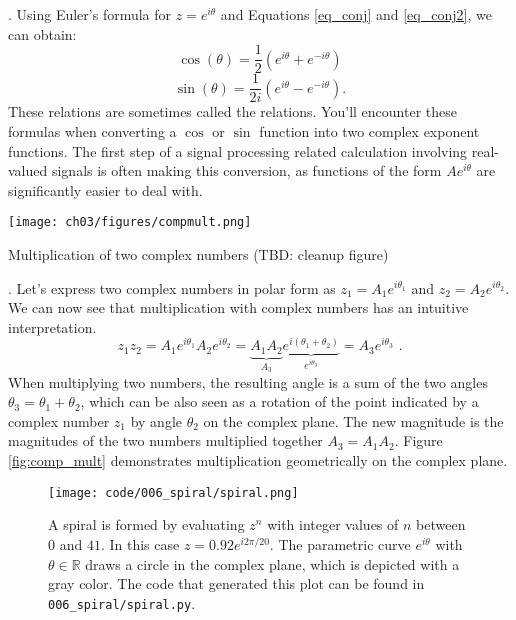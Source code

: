 . Using Euler's formula for $z=e^{i\theta}$ and Equations \ref{eq_conj} and \ref{eq_conj2}, we can obtain:
\begin{equation}
\boxed{
  \cos(\theta)  = \frac{1}{2}\left(e^{i\theta} + e^{-i\theta}\right) \label{inveul0}
  }
  \end{equation}
\begin{equation}
\boxed{
  \sin(\theta)  = \frac{1}{2i}\left(e^{i\theta} - e^{-i\theta}\right). \label{inveul}
  }
\end{equation}
These relations are sometimes called the \emph{} relations. You'll encounter these formulas when converting a $\cos$ or $\sin$ function into two complex exponent functions. The first step of a signal processing related calculation involving real-valued signals is often making this conversion, as functions of the form $A e^{i\theta}$ are significantly easier to deal with.

\begin{marginfigure}
  \begin{center}
\texttt{[image: ch03/figures/compmult.png]}
\end{center}
  \caption{Multiplication of two complex numbers (TBD: cleanup figure)}
  \label{fig:comp_mult}
\end{marginfigure}

. Let's express two complex numbers in polar form as $z_1=A_1e^{i\theta_1}$ and $z_2=A_2e^{i\theta_2}$. We can now see that multiplication with complex numbers has an intuitive interpretation.
\begin{equation}
  z_1 z_2 = A_1 e^{i\theta_1} A_2 e^{i\theta_2} = \underbrace{A_1
    A_2}_{A_3} \underbrace{e^{i(\theta_1 + \theta_2)}}_{e^{i\theta_3}} =
  A_3 e^{i\theta_3} \,\,.
\end{equation}
When multiplying two numbers, the resulting angle is a sum of the two angles $\theta_3=\theta_1 + \theta_2$, which can be also seen as a rotation of the point indicated by a complex number $z_1$ by angle $\theta_2$ on the complex plane. The new magnitude is the magnitudes of the two numbers multiplied together $A_3=A_1A_2$. Figure \ref{fig:comp_mult} demonstrates multiplication geometrically on the complex plane.

\begin{figure}
  \begin{center}
    \texttt{[image: code/006\_spiral/spiral.png]}
  \end{center}
  \caption{A spiral is formed by evaluating $z^n$ with integer values of $n$ between $0$ and $41$. In this case $z = 0.92 e^{i 2\pi /20}$. The parametric curve $e^{i\theta}$ with $\theta \in \mathbb{R}$ draws a circle in the complex plane, which is depicted with a gray color. The code that generated this plot can be found in \texttt{006\_spiral/spiral.py}.}
  \label{fig:spirals}
\end{figure}

